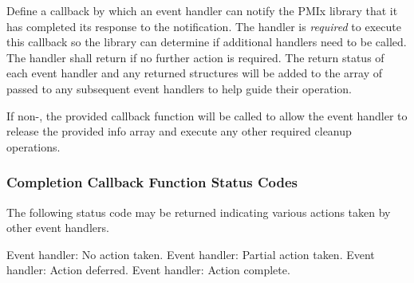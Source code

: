 \descr

Define a callback by which an event handler can notify the \ac{PMIx} library that it has completed its response to the notification. The handler is \textit{required} to execute this callback so the library can determine if additional handlers need to be called. The handler shall return  if no further action is required. The return status of each event handler and any returned  structures will be added to the  array of  passed to any subsequent event handlers to help guide their operation.

If non-, the provided callback function will be called to allow the event handler to release the provided info array and execute any other required cleanup operations.

\subsubsection{Completion Callback Function Status Codes}

The following status code may be returned indicating various actions taken by other event handlers.

\begin{constantdesc}
%
Event handler: No action taken.
%
Event handler: Partial action taken.
%
Event handler: Action deferred.
%
Event handler: Action complete.
%
\end{constantdesc}

